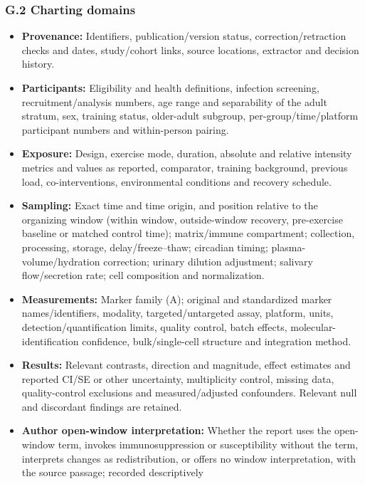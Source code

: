 \documentclass[
  11pt,
  a4paper,
]{article}
\providecommand{\tightlist}{%
  \setlength{\itemsep}{0pt}\setlength{\parskip}{0pt}}
\begin{document}
\subsubsection{G.2 Charting domains}\label{g.2-charting-domains}

\begin{itemize}
\tightlist
\item
  \textbf{Provenance:} Identifiers, publication/version status,
  correction/retraction checks and dates, study/cohort links, source
  locations, extractor and decision history.
\item
  \textbf{Participants:} Eligibility and health definitions, infection
  screening, recruitment/analysis numbers, age range and separability of
  the adult stratum, sex, training status, older-adult subgroup,
  per-group/time/platform participant numbers and within-person pairing.
\item
  \textbf{Exposure:} Design, exercise mode, duration, absolute and
  relative intensity metrics and values as reported, comparator,
  training background, previous load, co-interventions, environmental
  conditions and recovery schedule.
\item
  \textbf{Sampling:} Exact time and time origin, and position relative
  to the organizing window (within window, outside-window recovery,
  pre-exercise baseline or matched control time); matrix/immune
  compartment; collection, processing, storage, delay/freeze--thaw;
  circadian timing; plasma-volume/hydration correction; urinary dilution
  adjustment; salivary flow/secretion rate; cell composition and
  normalization.
\item
  \textbf{Measurements:} Marker family (A); original and standardized
  marker names/identifiers, modality, targeted/untargeted assay,
  platform, units, detection/quantification limits, quality control,
  batch effects, molecular-identification confidence, bulk/single-cell
  structure and integration method.
\item
  \textbf{Results:} Relevant contrasts, direction and magnitude, effect
  estimates and reported CI/SE or other uncertainty, multiplicity
  control, missing data, quality-control exclusions and
  measured/adjusted confounders. Relevant null and discordant findings
  are retained.
\item
  \textbf{Author open-window interpretation:} Whether the report uses
  the open-window term, invokes immunosuppression or susceptibility
  without the term, interprets changes as redistribution, or offers no
  window interpretation, with the source passage; recorded descriptively

\end{itemize}
\end{document}
